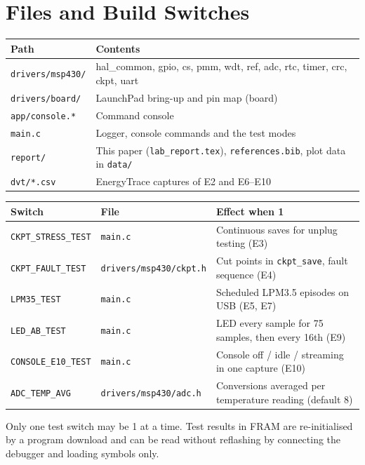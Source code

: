 \documentclass[conference]{IEEEtran}
\newcommand{\code}[1]{\texttt{#1}}
\begin{document}
\section{Files and Build Switches}

\begin{table}[H]
\centering\small
\begin{tabularx}{\textwidth}{@{}lL@{}}
\toprule
Path & Contents \\
\midrule
\code{drivers/msp430/} & hal\_common, gpio, cs, pmm, wdt, ref, adc, rtc, timer, crc, ckpt, uart \\
\code{drivers/board/} & LaunchPad bring-up and pin map (board) \\
\code{app/console.*} & Command console \\
\code{main.c} & Logger, console commands and the test modes \\
\code{report/} & This paper (\code{lab\_report.tex}), \code{references.bib}, plot data in \code{data/} \\
\code{dvt/*.csv} & EnergyTrace captures of E2 and E6--E10 \\
\bottomrule
\end{tabularx}
\end{table}

\begin{table}[H]
\centering\small
\begin{tabularx}{\textwidth}{@{}llL@{}}
\toprule
Switch & File & Effect when 1 \\
\midrule
\code{CKPT\_STRESS\_TEST} & \code{main.c} & Continuous saves for unplug testing (E3) \\
\code{CKPT\_FAULT\_TEST} & \code{drivers/msp430/ckpt.h} & Cut points in \code{ckpt\_save}, fault sequence (E4) \\
\code{LPM35\_TEST} & \code{main.c} & Scheduled LPM3.5 episodes on USB (E5, E7) \\
\code{LED\_AB\_TEST} & \code{main.c} & LED every sample for 75 samples, then every 16th (E9) \\
\code{CONSOLE\_E10\_TEST} & \code{main.c} & Console off / idle / streaming in one capture (E10) \\
\code{ADC\_TEMP\_AVG} & \code{drivers/msp430/adc.h} & Conversions averaged per temperature reading (default 8) \\
\bottomrule
\end{tabularx}
\end{table}

\noindent Only one test switch may be 1 at a time. Test results in FRAM are re-initialised by a program download and can be read without reflashing by connecting the debugger and loading symbols only.
\end{document}
